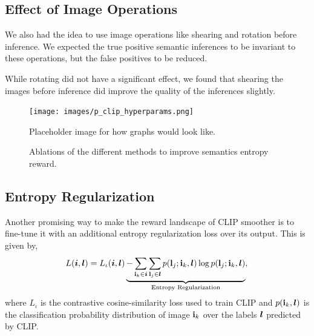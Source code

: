 \subsection{Effect of Image Operations}
\label{sec:image-operations}
We also had the idea to use image operations like shearing and rotation before inference.
We expected the true positive semantic inferences to be invariant to these operations, but the false positives to be reduced.

While rotating did not have a significant effect, we found that shearing the images before inference did improve the quality of the inferences slightly.

\begin{figure}[H]
    \centering
    \texttt{[image: images/p\_clip\_hyperparams.png]}
    \caption{Placeholder image for how graphs would look like.}
    \label{fig:clip-hyperparams}
\end{figure}

\begin{figure}[H]
    \centering
    \caption{Ablations of the different methods to improve semantics entropy reward.}
    \label{fig:clip-ablation}
\end{figure}


\subsection{Entropy Regularization}
\label{sec:entropy-regularization}
Another promising way to make the reward landscape of CLIP smoother is to fine-tune it with an additional entropy regularization loss over its output.
This is given by,
\begin{equation}
    \label{eq:entropy-regularization}
    L(\bm{i}, \bm{l}) = L_{\iota}(\bm{i}, \bm{l}) \underbrace{- \sum_{\mathbf{i}_k \in \bm{i}}\sum_{\mathbf{l}_j \in \bm{l}} p(\mathbf{l}_j; \mathbf{i}_k, \bm{l}) \log p(\mathbf{l}_j; \mathbf{i}_k, \bm{l})}_{\text{Entropy Regularization}},\\
\end{equation}
where \(L_{\iota}\) is the contrastive cosine-similarity loss used to train CLIP and \(p(\mathbf{i}_k, \bm{l})\) is the classification probability distribution of image \(\mathbf{i}_k\) over the labels \(\bm{l}\) predicted by CLIP.


